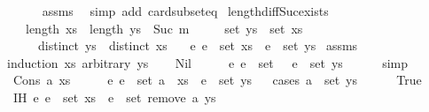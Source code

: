 \begin{isabellebody}
\ \ \ \ \isamarkupfalse%
\ assms{\isacharparenleft}{}{\isacharparenright}\ \isamarkupfalse%
\ {\isacharparenleft}simp\ add{\isacharcolon}\ card{\isacharunderscore}subset{\isacharunderscore}eq{\isacharparenright}\isanewline
{}\isamarkupfalse%
%
\endisatagproof
{\isafoldproof}%
%
\isadelimproof
\isanewline
%
\endisadelimproof
\isanewline
{}\isamarkupfalse%
\ length{\isacharunderscore}diff{\isacharunderscore}Suc{\isacharunderscore}exists{\isacharcolon}\isanewline
\ \ \ {\isachardoublequoteopen}length\ xs\ {\isacharminus}\ length\ ys\ {\isacharequal}\ Suc\ m{\isachardoublequoteclose}\isanewline
\ \ \ \ \ {\isachardoublequoteopen}set\ ys\ {\isasymsubseteq}\ set\ xs{\isachardoublequoteclose}\isanewline
\ \ \ \ \ {\isachardoublequoteopen}distinct\ ys{\isachardoublequoteclose}\ \ {\isachardoublequoteopen}distinct\ xs{\isachardoublequoteclose}\isanewline
\ \ \ {\isachardoublequoteopen}{\isasymexists}e{\isachardot}\ e\ {\isasymin}\ set\ xs\ {\isasymand}\ e\ {\isasymnotin}\ set\ ys{\isachardoublequoteclose}\isanewline
%
\isadelimproof
%
\endisadelimproof
%
\isatagproof
{}\isamarkupfalse%
\ assms\ \isamarkupfalse%
{\isacharparenleft}induction\ xs\ arbitrary{\isacharcolon}\ ys{\isacharparenright}\isanewline
\ \ \isamarkupfalse%
\ Nil\isanewline
\ \ \isamarkupfalse%
\ \isamarkupfalse%
\ {\isachardoublequoteopen}{\isasymexists}e{\isachardot}\ e\ {\isasymin}\ set\ {\isacharbrackleft}{\isacharbrackright}\ {\isasymand}\ e\ {\isasymnotin}\ set\ ys{\isachardoublequoteclose}\isanewline
\ \ \ \ \isamarkupfalse%
\ simp\isanewline
{}\isamarkupfalse%
\isanewline
\ \ \isamarkupfalse%
\ {\isacharparenleft}Cons\ a\ xs{\isacharparenright}\isanewline
\ \ \isamarkupfalse%
\ \isamarkupfalse%
\ {\isachardoublequoteopen}{\isasymexists}e{\isachardot}\ e\ {\isasymin}\ set\ {\isacharparenleft}a\ {\isacharhash}\ xs{\isacharparenright}\ {\isasymand}\ e\ {\isasymnotin}\ set\ ys{\isachardoublequoteclose}\isanewline
\ \ \isamarkupfalse%
{\isacharparenleft}cases\ {\isachardoublequoteopen}a\ {\isasymin}\ set\ ys{\isachardoublequoteclose}{\isacharparenright}\isanewline
\ \ \ \ \isamarkupfalse%
\ True\isanewline
\ \ \ \ \isamarkupfalse%
\ IH{\isacharcolon}\ {\isachardoublequoteopen}{\isasymexists}e{\isachardot}\ e\ {\isasymin}\ set\ xs\ {\isasymand}\ e\ {\isasymnotin}\ set\ {\isacharparenleft}remove{}\ a\ ys{\isacharparenright}{\isachardoublequoteclose}\isanewline

\end{isabellebody}
